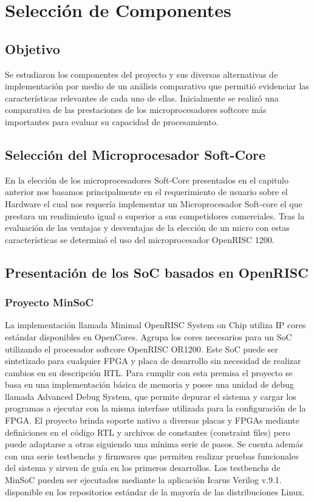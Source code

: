 \chapter{Selección de Componentes}

\section{Objetivo}
			Se estudiaron los componentes del proyecto y sus diversas alternativas de implementación por medio de un análisis comparativo que permitió evidenciar
			las características relevantes de cada uno de ellas. Inicialmente se realizó una comparativa de las prestaciones de los microprocesadores softcore
			más importantes para evaluar su capacidad de procesamiento.

\section{Selección del Microprocesador Soft-Core}


En la elección de los microprocesadores Soft-Core presentados en el capitulo anterior nos basamos principalmente en el requerimiento de usuario sobre el Hardware el cual nos requería implementar un Microprocesador Soft-core el que prestara un rendimiento igual o superior a sus competidores comerciales. Tras la evaluación de las ventajas y desventajas de la elección de un micro con estas características se determinó el uso del microprocesador OpenRISC 1200. 	


		    
			


\section{Presentación de los SoC basados en OpenRISC}
				
				\subsection{Proyecto MinSoC}
				La implementación llamada Minimal OpenRISC System on Chip utiliza IP cores estándar disponibles en OpenCores. Agrupa los cores necesarios para un SoC utilizando el procesador softcore OpenRISC OR1200. Este SoC puede ser sintetizado para cualquier FPGA y placa de desarrollo sin necesidad de realizar cambios en su descripción RTL. Para cumplir con esta premisa el proyecto se basa en una implementación básica de memoria y posee una unidad de debug llamada Advanced Debug System, que permite depurar el sistema y cargar los programas a ejecutar con la misma interfase utilizada para la configuración de la FPGA.				El proyecto brinda soporte nativo a diversas placas y FPGAs mediante definiciones en el código RTL y archivos de constantes (constraint files)
				pero puede adaptarse a otras siguiendo una mínima serie de pasos. Se cuenta además con una serie testbenchs y firmwares que permiten realizar
				pruebas funcionales del sistema y sirven de guía en los primeros desarrollos. Los testbenchs de MinSoC pueden ser ejecutados mediante la
				aplicación Icarus Verilog v.9.1. disponible en los repositorios estándar de la mayoría de las distribuciones Linux. 
				
